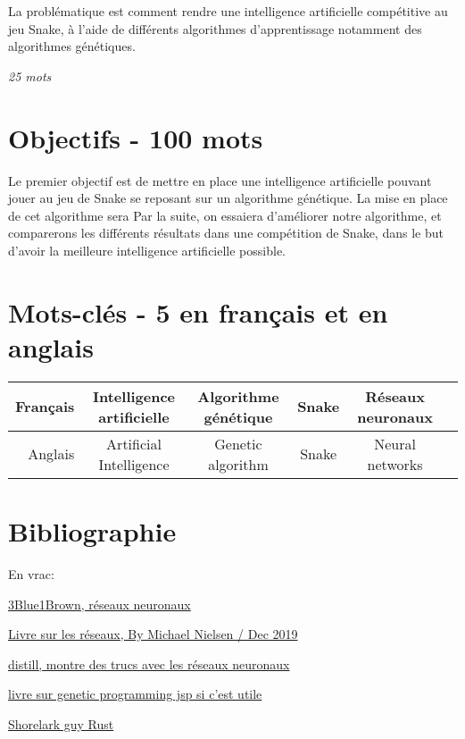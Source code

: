 \documentclass[11pt,a4paper]{article}
\begin{document}
La problématique est comment rendre une intelligence artificielle compétitive au jeu Snake, à l'aide de différents algorithmes d'apprentissage notamment des algorithmes génétiques.

\textit{25 mots}

\section{Objectifs - 100 mots}

Le premier objectif est de mettre en place une intelligence
artificielle pouvant jouer au jeu de Snake se reposant sur un
algorithme génétique.
La mise en place de cet algorithme sera
Par la suite, on essaiera d'améliorer notre algorithme, et 
comparerons les différents résultats dans une compétition de Snake,
dans le but d'avoir la meilleure intelligence artificielle possible.

\section{Mots-clés - 5 en français et en anglais}

\begin{tabular}{||r|c|c|c|c|c||} \hline
	Français & Intelligence artificielle & Algorithme génétique & Snake & Réseaux neuronaux &  \\ \hline \hline
	Anglais & Artificial Intelligence & Genetic algorithm & Snake & Neural networks &  \\
		\hline
	\end{tabular}

\section{Bibliographie}

En vrac:

\href{https://www.3blue1brown.com/topics/neural-networks}{3Blue1Brown, réseaux neuronaux}

\href{http://neuralnetworksanddeeplearning.com/index.html}{Livre sur les réseaux, By Michael Nielsen / Dec 2019}

\href{https://distill.pub}{distill, montre des trucs avec les réseaux neuronaux}

\href{http://www0.cs.ucl.ac.uk/staff/W.Langdon/ftp/papers/poli08_fieldguide.pdf}{livre sur genetic programming jsp si c'est utile}

\href{https://pwy.io/posts/learning-to-fly-pt1/}{Shorelark guy Rust}
\end{document}
